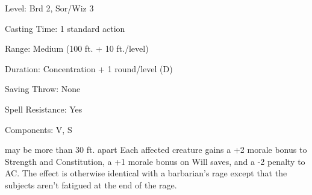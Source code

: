 
\begin{description*}
\item[Level:] Brd 2, Sor/Wiz 3
\item[Casting Time:] 1 standard action
\item[Range:] Medium (100 ft. + 10 ft./level)
\item[Duration:] Concentration + 1 round/level (D)
\item[Saving Throw:] None
\item[Spell Resistance:] Yes
\item[Components:] V, S
\end{description*}

may be more than 30 ft. apart
Each affected creature gains a +2 morale bonus to Strength and Constitution, a
+1 morale bonus on Will saves, and a -2 penalty to AC. The effect is otherwise
identical with a barbarian's rage except that the subjects aren't fatigued at the
end of the rage.